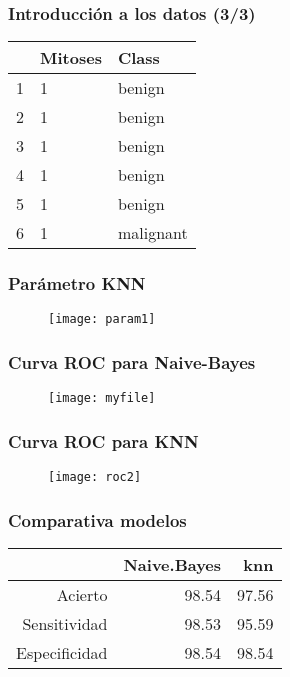 \documentclass{beamer}
\theoremstyle{definition}
\begin{document}
\begin{frame}
\frametitle{Introducción a los datos (3/3)}
\begin{table}[ht]
\centering
\begin{tabular}{rll}
  \hline
 & Mitoses & Class \\ 
  \hline
1 & 1 & benign \\ 
  2 & 1 & benign \\ 
  3 & 1 & benign \\ 
  4 & 1 & benign \\ 
  5 & 1 & benign \\ 
  6 & 1 & malignant \\ 
   \hline
\end{tabular}
\end{table}

\end{frame}



\begin{frame}
\frametitle{Parámetro KNN}
\begin{figure}[h!]
\texttt{[image: param1]}
\end{figure}
\end{frame}





\begin{frame}
\frametitle{Curva ROC para Naive-Bayes}
\begin{figure}[h!]
\texttt{[image: myfile]}
\end{figure}
\end{frame}


\begin{frame}
\frametitle{Curva ROC para KNN}
\begin{figure}[h!]
\texttt{[image: roc2]}
\end{figure}
\end{frame}

\begin{frame}
\frametitle{Comparativa modelos}
\begin{table}[ht]
\centering
\begin{tabular}{rrr}
  \hline
 & Naive.Bayes & knn \\ 
  \hline
Acierto & 98.54 & 97.56 \\ 
  Sensitividad & 98.53 & 95.59 \\ 
  Especificidad & 98.54 & 98.54 \\ 
   \hline
\end{tabular}
\end{table}

\end{frame}
\end{document}
